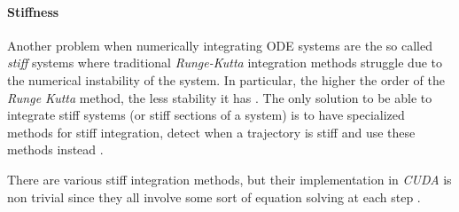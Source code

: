 \pagebreak
\paragraph{Stiffness} %
\label{sub:stiffness}

Another problem when numerically integrating ODE systems are the so called
\emph{stiff} systems where traditional \emph{Runge-Kutta} integration methods
struggle due to the numerical instability of the system. In particular, the
higher the order of the \emph{Runge Kutta} method, the less stability it has
\cite{skvortsov_accuracy_2003}.
The only solution to be able to integrate stiff systems (or stiff sections of a
system) is to have specialized methods for stiff integration, detect when a
trajectory is stiff and use these methods instead
\cite{shampine_detecting_1977}.

There are various stiff integration methods, but their implementation in
\emph{CUDA} is non trivial since they all involve some sort of equation solving
at each step \cite{butcher_numerical_2008}.

